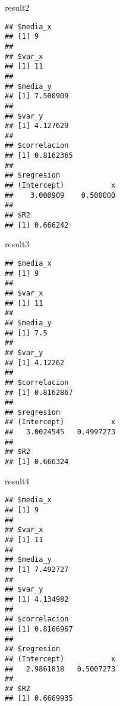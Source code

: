 \documentclass[
]{article}
\newenvironment{Shaded}{\begin{snugshade}}{\end{snugshade}}
\newcommand{\NormalTok}[1]{#1}
\begin{document}
\begin{Shaded}
\begin{Highlighting}[]
\NormalTok{result2 }
\end{Highlighting}
\end{Shaded}

\begin{verbatim}
## $media_x
## [1] 9
## 
## $var_x
## [1] 11
## 
## $media_y
## [1] 7.500909
## 
## $var_y
## [1] 4.127629
## 
## $correlacion
## [1] 0.8162365
## 
## $regresion
## (Intercept)           x 
##    3.000909    0.500000 
## 
## $R2
## [1] 0.666242
\end{verbatim}

\begin{Shaded}
\begin{Highlighting}[]
\NormalTok{result3 }
\end{Highlighting}
\end{Shaded}

\begin{verbatim}
## $media_x
## [1] 9
## 
## $var_x
## [1] 11
## 
## $media_y
## [1] 7.5
## 
## $var_y
## [1] 4.12262
## 
## $correlacion
## [1] 0.8162867
## 
## $regresion
## (Intercept)           x 
##   3.0024545   0.4997273 
## 
## $R2
## [1] 0.666324
\end{verbatim}

\begin{Shaded}
\begin{Highlighting}[]
\NormalTok{result4 }
\end{Highlighting}
\end{Shaded}

\begin{verbatim}
## $media_x
## [1] 9
## 
## $var_x
## [1] 11
## 
## $media_y
## [1] 7.492727
## 
## $var_y
## [1] 4.134982
## 
## $correlacion
## [1] 0.8166967
## 
## $regresion
## (Intercept)           x 
##   2.9861818   0.5007273 
## 
## $R2
## [1] 0.6669935
\end{verbatim}
\end{document}
